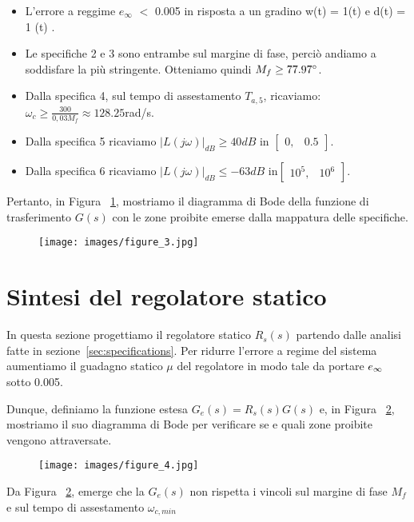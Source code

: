 \documentclass[a4paper, 11pt]{article}
\begin{document}
\begin{itemize}
	\item[1)] L'errore a reggime $e_{\infty}$ $ < $ 0.005 in risposta a un gradino w(t) = 1(t) e d(t) = 1 (t) .\\
	\item[2)] Le specifiche 2 e 3 sono entrambe sul margine di fase, perci\`o andiamo a soddisfare la pi\`u stringente. Otteniamo quindi $M_f\ge77.97\degree$.
	\\
	\item[3)] Dalla specifica 4, sul tempo di assestamento $T_{a,5}$, ricaviamo: $\omega _c \ge \frac{300}{0,03 M_f} \approx 128.25$rad/s.
	\item[4)] Dalla specifica 5 ricaviamo $|L(j\omega)|_{dB} \ge 40dB$ in $\begin{bmatrix}
	    0 , & 0.5
	\end{bmatrix}$.\\
	\item[5)] Dalla specifica 6 ricaviamo $|L(j\omega)|_{dB} \le -63dB$ in$\begin{bmatrix}
	    10^5 , & 10^6
	\end{bmatrix}$.\\
\end{itemize}

Pertanto, in Figura ~\ref{Figura2}, mostriamo il diagramma di Bode della funzione di trasferimento $G(s)$ con le zone proibite emerse dalla mappatura delle specifiche.
\begin{figure}[H]
    \centering
\texttt{[image: images/figure\_3.jpg]}
    \caption{}
    \label{Figura2}
\end{figure}
\section{Sintesi del regolatore statico}
\label{sec:static_regulator}

In questa sezione progettiamo il regolatore statico $R_s(s)$ partendo dalle analisi fatte in sezione~\ref{sec:specifications}.
Per ridurre l'errore a regime del sistema aumentiamo il guadagno statico $\mu$ del regolatore in modo tale da portare $e_\infty \space $ sotto 0.005.

Dunque, definiamo la funzione estesa $G_e(s) = R_s(s)G(s)$ e, in Figura ~\ref{Figura3}, mostriamo il suo diagramma di Bode per verificare se e quali zone proibite vengono attraversate.
\begin{figure}[H]
    \centering
\texttt{[image: images/figure\_4.jpg]}
    \caption{}
    \label{Figura3}
\end{figure}
Da Figura ~\ref{Figura3}, emerge che la $G_e(s)$ non rispetta i vincoli sul margine di fase $M_f$ e sul tempo di assestamento $\omega_{c,min}$
\end{document}
